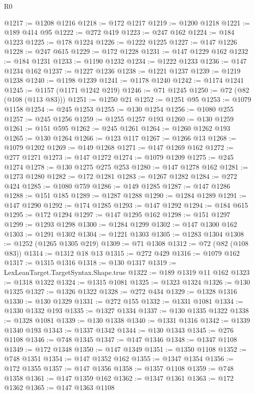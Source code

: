 \begin{lexlean}{R0}
\begin{coremodule}
@1217 := @1208 @1216
@1218 := @172 @1217
@1219 := @1200 @1218
@1221 := @189 @414 @95
@1222 := @272 @419
@1223 := @247 @162
@1224 := @184 @1223
@1225 := @178 @1224
@1226 := @1222 @1225
@1227 := @147 @1226
@1228 := @247 @615
@1229 := @172 @1228
@1231 := @147 @1229 @162
@1232 := @184 @1231
@1233 := @1190 @1232
@1234 := @1222 @1233
@1236 := @147 @1234 @162
@1237 := @1227 @1236
@1238 := @1221 @1237
@1239 := @1219 @1238
@1240 := @1198 @1239
@1241 := @1178 @1240
@1242 := @1174 @1241
@1245 := @1157 (@1171 @1242 @219)
@1246 := @71 @1245
@1250 := @72 (@82 (@108 (@113 @83)))
@1251 := @1250 @21
@1252 := @1251 @95
@1253 := @1079 @1158
@1254 := @245 @1253
@1255 := @130 @1254
@1256 := @1080 @255
@1257 := @245 @1256
@1259 := @1255 @1257 @193
@1260 := @130 @1259
@1261 := @151 @595
@1262 := @245 @1261
@1264 := @1260 @1262 @193
@1265 := @130 @1264
@1266 := @123 @117
@1267 := @1266 @13
@1268 := @1079 @1202
@1269 := @149 @1268
@1271 := @147 @1269 @162
@1272 := @277 @1271
@1273 := @147 @1272
@1274 := @1079 @1209
@1275 := @245 @1274
@1278 := @130 @1275 @275 @253
@1280 := @147 @1278 @162
@1281 := @1273 @1280
@1282 := @172 @1281
@1283 := @1267 @1282
@1284 := @272 @424
@1285 := @1080 @759
@1286 := @149 @1285
@1287 := @147 @1286
@1288 := @151 @185
@1289 := @1287 @1288
@1290 := @1284 @1289
@1291 := @147 @1290
@1292 := @174 @1285
@1293 := @147 @1292
@1294 := @184 @615
@1295 := @172 @1294
@1297 := @147 @1295 @162
@1298 := @151 @1297
@1299 := @1293 @1298
@1300 := @1284 @1299
@1302 := @147 @1300 @162
@1303 := @1291 @1302
@1304 := @1221 @1303
@1305 := @1283 @1304
@1308 := @1252 (@1265 @1305 @219)
@1309 := @71 @1308
@1312 := @72 (@82 (@108 @83))
@1314 := @1312 @18 @13
@1315 := @272 @429
@1316 := @1079 @162
@1317 := @1315 @1316
@1318 := @130 @1317
@1319 := LexLeanTarget.TargetSyntax.Shape.true
@1322 := @189 @1319 @11 @162
@1323 := @1318 @1322
@1324 := @1315 @1081
@1325 := @1323 @1324
@1326 := @130 @1325
@1327 := @1326 @1322
@1328 := @272 @434
@1329 := @1328 @1316
@1330 := @130 @1329
@1331 := @272 @155
@1332 := @1331 @1081
@1334 := @1330 @1332 @193
@1335 := @1327 @1334
@1337 := @130 @1335 @1322
@1338 := @1328 @1081
@1339 := @130 @1338
@1340 := @1331 @1316
@1342 := @1339 @1340 @193
@1343 := @1337 @1342
@1344 := @130 @1343
@1345 := @276 @1108
@1346 := @748 @1345
@1347 := @147 @1346
@1348 := @1347 @1108
@1349 := @172 @1348
@1350 := @147 @1349
@1351 := @1350 @1108
@1352 := @748 @1351
@1354 := @147 @1352 @162
@1355 := @1347 @1354
@1356 := @172 @1355
@1357 := @147 @1356
@1358 := @1357 @1108
@1359 := @748 @1358
@1361 := @147 @1359 @162
@1362 := @1347 @1361
@1363 := @172 @1362
@1365 := @147 @1363 @1108

\end{coremodule}
\end{lexlean}
